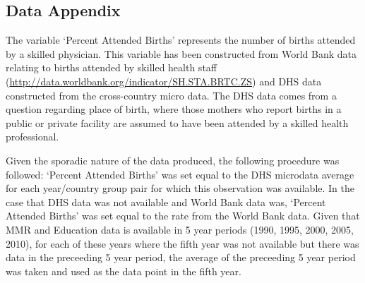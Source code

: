 \documentclass{article}[12pt,subeqn]
\begin{document}
\begin{spacing}{1.4}
\section{Data Appendix}
\label{scn:dataappendix}
The variable `Percent Attended Births' represents the number of births attended 
by a skilled physician.  This variable has been constructed from World Bank data 
relating to births attended by skilled health staff 
(\url{http://data.worldbank.org/indicator/SH.STA.BRTC.ZS}) and DHS data 
constructed from the cross-country micro data. The DHS data comes from a 
question regarding place of birth, where those mothers who report births in a 
public or private facility are assumed to have been attended by a skilled health 
professional.  

Given the sporadic nature of the data produced, the following procedure was 
followed: `Percent Attended Births' was set equal to the DHS microdata average 
for each year/country group pair for which this observation was available.  In 
the case that DHS data was not available and World Bank data was, `Percent 
Attended Births' was set equal to the rate from the World Bank data.  Given that 
MMR and Education data is available in 5 year periods (1990, 1995, 2000, 2005, 
2010), for each of these years where the fifth year was not available but there 
was data in the preceeding 5 year period, the average of the preceeding 5 year 
period was taken and used as the data point in the fifth year.


\end{spacing}
\end{document}
